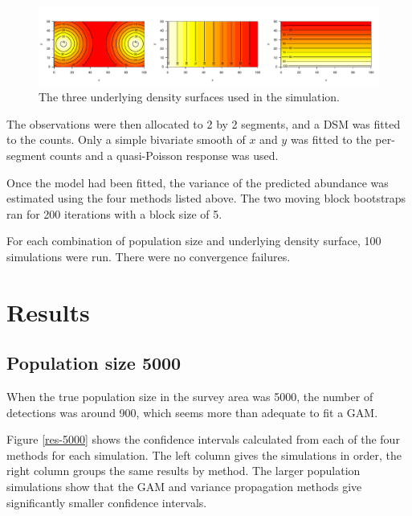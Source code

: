 \documentclass[11pt]{amsart}
\begin{document}
\begin{figure}[htbp]
\begin{center}
\includegraphics[width=\textwidth]{sim-plots}
\caption{The three underlying density surfaces used in the simulation.}
\label{sim-plots}
\end{center}
\end{figure}

The observations were then allocated to 2 by 2 segments, and a DSM was fitted to the counts. Only a simple bivariate smooth of $x$ and $y$ was fitted to the per-segment counts and a  quasi-Poisson response was used.

Once the model had been fitted, the variance of the predicted abundance was estimated using the four methods listed above. The two moving block bootstraps ran for 200 iterations with a block size of 5.

For each combination of population size and underlying density surface, 100 simulations were run. There were no convergence failures.

\section{Results}

\subsection{Population size 5000}

When the true population size in the survey area was 5000, the number of detections was around 900, which seems more than adequate to fit a GAM. 

Figure \ref{res-5000} shows the confidence intervals calculated from each of the four methods for each simulation. The left column gives the simulations in order, the right column groups the same results by method. The larger population simulations show that the GAM and variance propagation methods give significantly smaller confidence intervals. 
\end{document}
